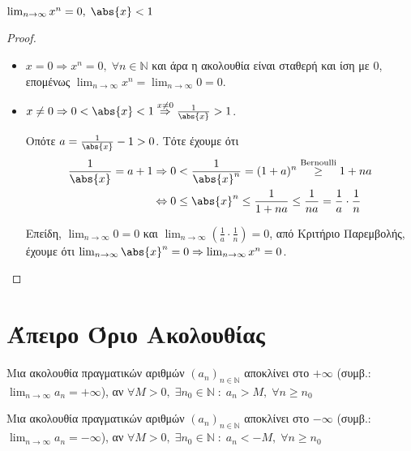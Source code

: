 \documentclass[main.tex]{subfiles}
\begin{document}
\begin{prop}
    $ \lim_{n \to \infty} x^{n} = 0, \; \abs{x} <1  $
\end{prop}

\begin{proof}
\item {}
    \begin{itemize}
        \item $ x = 0 \Rightarrow x^{n} = 0, \; \forall n \in \mathbb{N} $ 
                και άρα η ακολουθία είναι σταθερή και ίση με 0, επομένως 
                $ \lim_{n \to \infty} x^{n} = \lim_{n \to \infty} 0 = 0 $.

            \item $ x \neq 0 \Rightarrow 0 < \abs{x} < 1 \overset{x \neq 0}{
                \Rightarrow} \frac{1}{\abs{x}} > 1  $. 

                Οπότε $ a = \frac{1}{\abs{x}} - 1 > 0 $. Τότε έχουμε ότι 
                \begin{align*} 
                    \frac{1}{\abs{x}} = a+1 &\Rightarrow 
                0< \frac{1}{\abs{x}^{n}}  = (1+a)^{n}
                \overset{\text{Bernoulli}}{\geq} 1 + na \\ 
                & \Leftrightarrow 0 \leq \abs{x}^{n} \leq \frac{1}{1+na} \leq \frac{1}{na} =
                \frac{1}{a} \cdot \frac{1}{n} 
                \end{align*} 

                Επείδη, $ \lim_{n \to \infty} 0 = 0 $ και $ \lim_{n \to \infty}
                \left(\frac{1}{a} \cdot \frac{1}{n} \right) = 0$, από Κριτήριο 
                Παρεμβολής, έχουμε ότι $ \lim_{n \to \infty} \abs{x} ^{n} = 
                0 \Rightarrow \lim_{n \to \infty}x^{n} = 0$.
    \end{itemize}
\end{proof}


\section{Άπειρο Όριο Ακολουθίας}


\begin{dfn}
    Μια ακολουθία πραγματικών αριθμών $ (a_{n})_{n \in \mathbb{N}} $ 
    αποκλίνει στο $ +\infty $ (συμβ.: $ \lim_{n \to \infty} a_{n} = + 
    \infty $), αν $ \forall M>0, \; \exists n_{0} \in 
    \mathbb{N} \; : \; a_{n} > M, \; \forall n \geq n_{0}$
\end{dfn}

\begin{dfn}
    Μια ακολουθία πραγματικών αριθμών $ (a_{n})_{n \in \mathbb{N}} $ 
    αποκλίνει στο $ -\infty $ (συμβ.: $ \lim_{n \to \infty} a_{n} = - 
    \infty $), αν $ \forall M>0, \; \exists n_{0} \in 
    \mathbb{N} \; : \; a_{n} < -M, \; \forall n \geq n_{0}$
\end{dfn}
\end{document}
